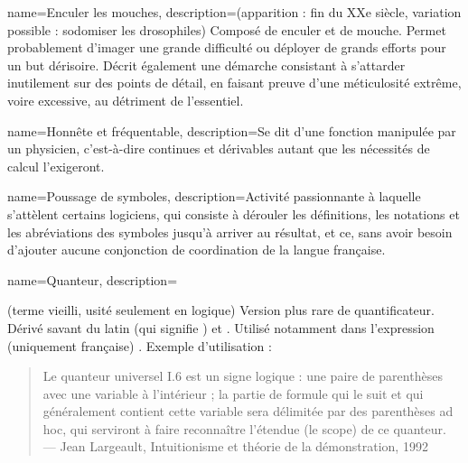 


{
	name=Enculer les mouches,
	description={(apparition : fin du XXe siècle, variation possible : sodomiser les drosophiles) Composé de enculer et de mouche. Permet probablement d'imager une grande difficulté ou déployer de grands efforts pour un but dérisoire. Décrit également une démarche consistant à s'attarder inutilement sur des points de détail, en faisant preuve d'une méticulosité extrême, voire excessive, au détriment de l'essentiel.}
}

{
	name=Honnête et fréquentable,
	description={Se dit d'une fonction manipulée par un physicien, c'est-à-dire continues et dérivables autant que les nécessités de calcul l'exigeront.}
}

{
	name=Poussage de symboles,
	description={Activité passionnante à laquelle s'attèlent certains logiciens, qui consiste à dérouler les définitions, les notations et les abréviations des symboles jusqu'à arriver au résultat, et ce, sans avoir besoin d'ajouter aucune conjonction de coordination de la langue française.}
}

{
	name=Quanteur,
	description={(terme vieilli, usité seulement en logique) Version plus rare de quantificateur. Dérivé savant du latin  (qui signifie ) et . Utilisé notamment dans l'expression (uniquement française) . Exemple d'utilisation : \begin{quote}
		Le quanteur universel I.6 est un signe logique : une paire de parenthèses avec une variable à l'intérieur ; la partie de formule qui le suit et qui généralement contient cette variable sera délimitée par des parenthèses ad hoc, qui serviront à faire reconnaître l’étendue (le scope) de ce quanteur.\\
		--- Jean Largeault, Intuitionisme et théorie de la démonstration, 1992
	\end{quote}}
}
